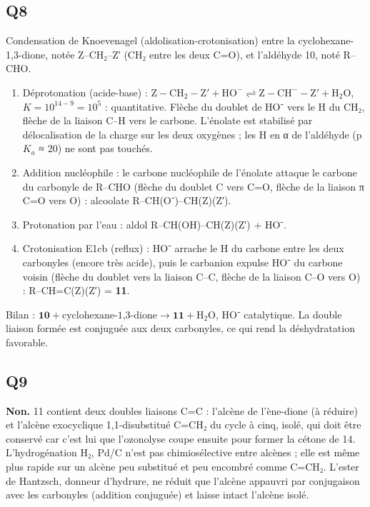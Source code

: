 \documentclass[11pt,a4paper]{article}
\providecommand{\tightlist}{\setlength{\itemsep}{0pt}\setlength{\parskip}{0pt}}
\begin{document}
\hypertarget{q8}{%
\subsection{Q8}\label{q8}}

Condensation de Knoevenagel (aldolisation-\allowbreak{}crotonisation) entre la cyclohexane-1,3-dione, notée Z--CH₂--Z′ (CH₂ entre les deux C=O), et l'aldéhyde 10, noté R--CHO.

\begin{enumerate}
\def\labelenumi{\arabic{enumi}.}
\tightlist
\item
  Déprotonation (acide-base) : \(\mathrm{Z{-}CH_2{-}Z'}+\mathrm{HO^-}\rightleftharpoons\mathrm{Z{-}CH^-{-}Z'}+\mathrm{H_2O}\), \(K=10^{14-9}=10^5\) : quantitative. Flèche du doublet de HO⁻ vers le H du CH₂, flèche de la liaison C--H vers le carbone. L'énolate est stabilisé par délocalisation de la charge sur les deux oxygènes ; les H en α de l'aldéhyde (p\(K_a\) ≈ 20) ne sont pas touchés.
\item
  Addition nucléophile : le carbone nucléophile de l'énolate attaque le carbone du carbonyle de R--CHO (flèche du doublet C vers C=O, flèche de la liaison π C=O vers O) : alcoolate R--CH(O⁻)--CH(Z)(Z′).
\item
  Protonation par l'eau : aldol R--CH(OH)--CH(Z)(Z′) + HO⁻.
\item
  Crotonisation E1cb (reflux) : HO⁻ arrache le H du carbone entre les deux carbonyles (encore très acide), puis le carbanion expulse HO⁻ du carbone voisin (flèche du doublet vers la liaison C--C, flèche de la liaison C--O vers O) : R--CH=C(Z)(Z′) = \textbf{11}.
\end{enumerate}

Bilan : \(\mathbf{10}+\text{cyclohexane-1,3-dione}\to\mathbf{11}+\mathrm{H_2O}\), HO⁻ catalytique. La double liaison formée est conjuguée aux deux carbonyles, ce qui rend la déshydratation favorable.

\hypertarget{q9}{%
\subsection{Q9}\label{q9}}

\textbf{Non.} 11 contient deux doubles liaisons C=C : l'alcène de l'ène-dione (à réduire) et l'alcène exocyclique 1,1-disubstitué C=CH₂ du cycle à cinq, isolé, qui doit être conservé car c'est lui que l'ozonolyse coupe ensuite pour former la cétone de 14. L'hydrogénation H₂, Pd/C n'est pas chimiosélective entre alcènes ; elle est même plus rapide sur un alcène peu substitué et peu encombré comme C=CH₂. L'ester de Hantzsch, donneur d'hydrure, ne réduit que l'alcène appauvri par conjugaison avec les carbonyles (addition conjuguée) et laisse intact l'alcène isolé.
\end{document}
